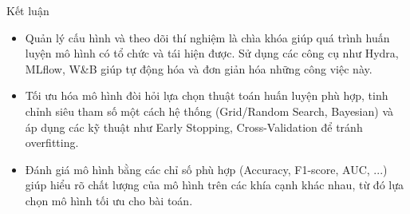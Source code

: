 \documentclass{beamer}
\begin{document}
\begin{frame}{Kết luận}
    \begin{itemize}
        \item Quản lý cấu hình và theo dõi thí nghiệm là chìa khóa giúp quá trình huấn luyện mô hình có tổ chức và tái hiện được. Sử dụng các công cụ như Hydra, MLflow, W\&B giúp tự động hóa và đơn giản hóa những công việc này.
        \item Tối ưu hóa mô hình đòi hỏi lựa chọn thuật toán huấn luyện phù hợp, tinh chỉnh siêu tham số một cách hệ thống (Grid/Random Search, Bayesian) và áp dụng các kỹ thuật như Early Stopping, Cross-Validation để tránh overfitting.
        \item Đánh giá mô hình bằng các chỉ số phù hợp (Accuracy, F1-score, AUC, ...) giúp hiểu rõ chất lượng của mô hình trên các khía cạnh khác nhau, từ đó lựa chọn mô hình tối ưu cho bài toán.
    \end{itemize}
\end{frame}
\end{document}
